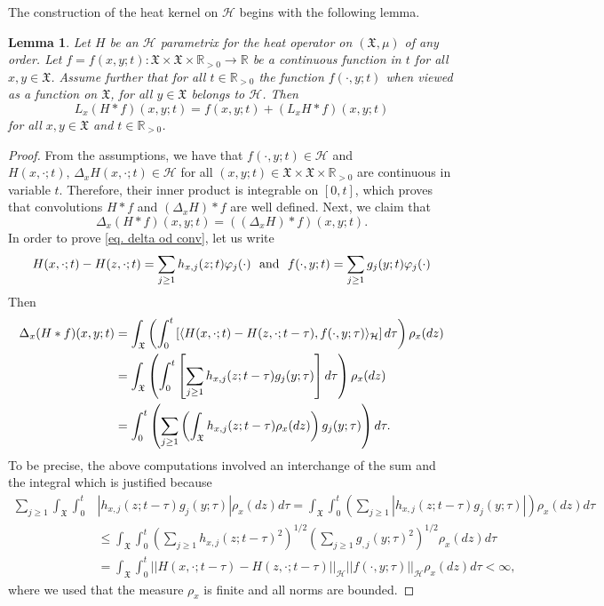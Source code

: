 \documentclass[11pt,reqno]{amsart}
\newtheorem{lemma}[theorem]{Lemma}
\theoremstyle{remark}
\theoremstyle{definition}
\numberwithin{theorem}{section} \numberwithin{equation}{section}
\newcommand{\Hil}{\mathcal{H}}
\newcommand{\X}{\mathfrak{X}}
\begin{document}
The construction of the heat kernel on $\Hil$ begins with the following lemma.

\begin{lemma}
\label{lem: L of convolHilb S}
Let $H$ be an $\mathcal{H}$ parametrix for the heat operator on $(\X,\mu)$ of any order.
Let $f=f(x,y;t):\X\times \X\times\mathbb{R}_{> 0}\to\mathbb{R}$
be a continuous function in $t$ for all $x,y\in \X$. Assume further that for all $t\in \mathbb{R}_{>0}$ the function
$f(\cdot,y;t)$ when viewed as a function on $\X$, for all $y\in\X$ belongs to $\mathcal{H}$.  Then
$$
L_{x}( H\ast f)(x,y;t)=f(x,y;t)+(L_{x}H \ast f)(x,y;t)
$$
for all $x,y\in \X$ and $t\in\mathbb{R}_{>0}$.
\end{lemma}

\begin{proof} From the assumptions, we have that $f(\cdot, y;t)\in \mathcal{H}$ and $H(x,\cdot;t), \, \Delta_{x}H(x,\cdot;t)\in \mathcal{H}$
for all $(x,y;t) \in \X\times \X \times \mathbb{R}_{>0}$ are continuous in variable $t$.  Therefore,
their inner product is integrable on $[0,t]$, which proves that convolutions $H\ast f$ and $(\Delta_{x}H)\ast f$ are well defined.
Next, we claim that
\begin{equation}\label{eq. delta od conv}
  \Delta_{x}(H\ast f)(x,y;t) =  \left( (\Delta_{x}H)\ast f\right)(x,y;t).
\end{equation}
In order to prove \eqref{eq. delta od conv}, let us write
$$
H(x,\cdot;t)- H(z,\cdot;t)=\sum_{j\geq 1}h_{x,j}(z;t)\varphi_j(\cdot)
\,\,\,\,
\text{\rm and}
\,\,\,\,
f(\cdot,y;t)=  \sum_{j\geq 1}g_j(y;t)\varphi_j(\cdot)
$$
Then
\begin{align} \notag
 \Delta_{x}(H\ast f)(x,y;t) &= \int_\X\left(\int_0^t \left[ \langle H(x,\cdot;t)- H(z,\cdot;t-\tau),  f(\cdot,y;\tau) \rangle_{\mathcal{H}} \right] d\tau\right)\rho_x(dz)\\ \notag
 &=\int_\X\left(\int_0^t \left[ \sum_{j\geq 1} h_{x,j}(z;t-\tau)g_j(y;\tau) \right] d\tau\right)\rho_x(dz)\\ &= \int_0^t \left( \sum_{j\geq 1} \left(\int_\X  h_{x,j}(z;t-\tau) \rho_x(dz)\right) g_j(y;\tau)  \right)d\tau\label{eq. interchange od deltax}.
\end{align}
To be precise, the above computations involved an
interchange of the sum and the integral which is justified because
\begin{align*}
\sum_{j\geq 1} \int_\X \int_0^t &| h_{x,j}(z;t-\tau)g_j(y;\tau)  | \rho_x(dz) d\tau = \int_\X \int_0^t \left(\sum_{j\geq 1}| h_{x,j}(z;t-\tau)g_j(y;\tau)  |\right)  \rho_x(dz) d\tau\\ &\leq \int_\X \int_0^t \left(\sum_{j\geq 1} h_{x,j}(z;t-\tau)^2 \right)^{1/2} \left(\sum_{j\geq 1} g_{,j}(y;\tau)^2 \right)^{1/2 }\rho_x(dz) d\tau \\&=\int_\X \int_0^t ||H(x,\cdot;t-\tau)- H(z,\cdot;t-\tau) ||_\mathcal{H} ||f(\cdot,y;\tau) ||_\mathcal{H}\rho_x(dz) d\tau <\infty,
\end{align*}
where we used that the measure $\rho_x$ is finite and all norms are bounded.


\end{proof}
\end{document}
